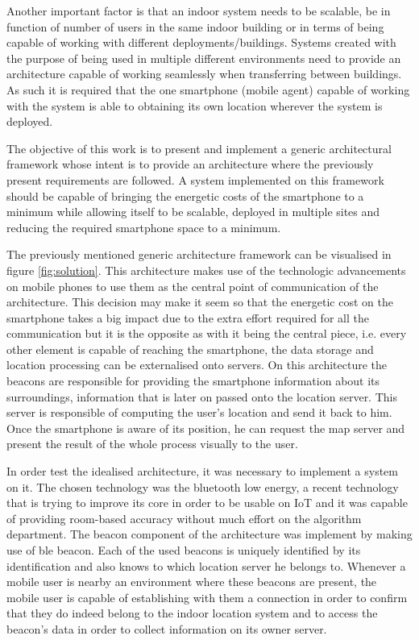 Another important factor is that an indoor system needs to be scalable, be in function of number of users in the same indoor building or in terms of being capable of working with different deployments/buildings. Systems created with the purpose of being used in multiple different environments need to provide an architecture capable of working seamlessly when transferring between buildings. As such it is required that the one smartphone (mobile agent) capable of working with the system is able to obtaining its own location wherever the system is deployed.  

The objective of this work is to present and implement a generic architectural framework whose intent is to provide an architecture where the previously present requirements are followed. A system implemented on this framework should be capable of bringing the energetic costs of the smartphone to a minimum while allowing itself to be scalable, deployed in multiple sites and reducing the required smartphone space to a minimum.

The previously mentioned generic architecture framework can be visualised in figure \ref{fig:solution}. This architecture makes use of the technologic advancements on mobile phones to use them as the central point of communication of the architecture. This decision may make it seem so that the energetic cost on the smartphone takes a big impact due to the extra effort required for all the communication but it is the opposite as with it being the central piece, i.e. every other element is capable of reaching the smartphone, the data storage and location processing can be externalised onto servers. On this architecture the beacons are responsible for providing the smartphone information about its surroundings, information that is later on passed onto the location server. This server is responsible of computing the user's location and send it back to him. Once the smartphone is aware of its position, he can request the map server and present the result of the whole process visually to the user.

In order test the idealised architecture, it was necessary to implement a system on it. The chosen technology was the bluetooth low energy, a recent technology that is trying to improve its core in order to be usable on \ac{IoT} and it was capable of providing room-based accuracy without much effort on the algorithm department. The beacon component of the architecture was implement by making use of ble beacon. Each of the used beacons is uniquely identified by its identification and also knows to which location server he belongs to. Whenever a mobile user is nearby an environment where these beacons are present, the mobile user is capable of establishing with them a connection in order to confirm that they do indeed belong to the indoor location system and to access the beacon's data in order to collect information on its owner server.

